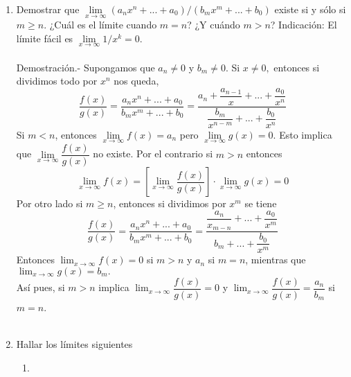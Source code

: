 \begin{enumerate}
\item Demostrar que $\lim\limits_{x\to \infty} \left(a_nx^n + ... + a_0\right)/\left(b_mx^m + ... + b_0\right)$ existe si y sólo si $m\geq n.$ ¿Cuál es el límite cuando $m=n$? ¿Y cuándo $m>n$? Indicación: El límite fácil es $\lim\limits_{x\to \infty} 1/x^k = 0$.\\\\
    Demostración.-\; Supongamos que $a_n\neq 0$ y $b_m\neq 0$. Si $x\neq 0,$ entonces si dividimos todo por $x^n$ nos queda, $$\dfrac{f(x)}{g(x)} =\dfrac{a_nx^n + ... + a_0}{b_mx^m+...+b_0} = \dfrac{a_n+\dfrac{a_{n-1}}{x}+...+\dfrac{a_0}{x^n}}{\dfrac{b_m}{x^{n-m}}+...+ \dfrac{b_0}{x^n}}$$
    Si $m<n$, entonces $\lim\limits_{x\to \infty}f(x)=a_n$ pero $\lim\limits_{x\to \infty}g(x)=0.$ Esto implica que $\lim\limits_{x\to \infty} \dfrac{f(x)}{g(x)}$ no existe. Por el contrario si $m>n$ entonces $$\lim_{x\to \infty} f(x) = \left[\lim_{x\to \infty} \dfrac{f(x)}{g(x)}\right]\cdot \lim_{x\to \infty}g(x)=0$$
    Por otro lado si $m\geq n$, entonces si dividimos por $x^m$ se tiene $$\dfrac{f(x)}{g(x)} =\dfrac{a_nx^n + ... + a_0}{b_mx^m+...+b_0} = \dfrac{\dfrac{a_n}{x_{m-n}}+...+\dfrac{a_0}{x^m}}{b_m+...+\dfrac{b_0}{x^m}}$$
    Entonces $\lim_{x\to \infty}f(x)=0$ si $m>n$ y $a_n$ si $m=n$, mientras que $\lim_{x\to \infty}g(x)=b_m.$ \\
    Así pues, si $m>n$ implica $\lim_{x\to \infty} \dfrac{f(x)}{g(x)}=0$ y $\lim_{x\to \infty}\dfrac{f(x)}{g(x)}=\dfrac{a_n}{b_m}$ si $m=n$.\\\\

\item Hallar los límites siguientes
\begin{enumerate}[\bfseries (i)]

    \item 

\end{enumerate}


\end{enumerate}
